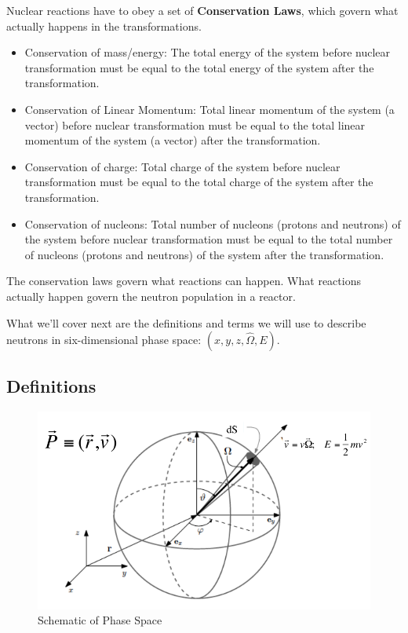 \documentclass[12pt]{article}
\newcommand{\vOmega}{\ensuremath{\hat{\Omega}}}
\begin{document}
Nuclear reactions have to obey a set of \textbf{Conservation Laws}, which 
govern what actually happens in the transformations. 

\begin{itemize}
\item Conservation of mass/energy: The total energy of the system before 
      nuclear transformation must be equal to the total energy of the system 
      after the transformation.
\item Conservation of Linear Momentum: Total linear momentum of the system (a  
      vector) before nuclear transformation must be equal to the total linear 
      momentum of the system (a vector) after the transformation.
\item Conservation of charge: Total charge of the system before nuclear
      transformation must be equal to the total charge of the system after the 
      transformation.
\item Conservation of nucleons: Total number of nucleons (protons and 
      neutrons) of the system before nuclear transformation must be equal to 
      the total number of nucleons (protons and neutrons) of the system after 
      the transformation.
\end{itemize}

The conservation laws govern what reactions can happen. What reactions 
actually happen govern the neutron population in a reactor. 

What we'll cover next are the definitions and terms we will use to describe 
neutrons in six-dimensional phase space: $(x,y,z,\vOmega, E)$.

\subsection*{Definitions}

\begin{figure}[h!]
    \begin{center}
    \includegraphics[keepaspectratio, width = 4 in]{phase-space}
    \end{center}
    \caption{Schematic of Phase Space}
    \label{fig:phase_space}
\end{figure}
\end{document}

